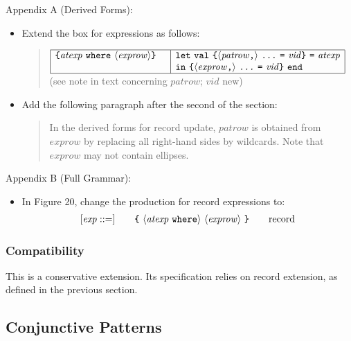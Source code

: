 \documentclass[twoside,titlepage]{article}
\begin{document}
\begin{appendix}
Appendix A (Derived Forms):
\begin{itemize}
\item Extend the box for expressions as follows: 
  \begin{quote}
  $\begin{array}{|l|l|}
  \hline
  \mbox{\tt\{}\mathit{atexp}~{\tt{where}}~\langle\mathit{exprow}\rangle\mbox{\tt\}}~~~
  & {\tt let}~{\tt val}~\mbox{\tt\{}\langle\mathit{patrow}\mbox{\tt,}\rangle~\mbox{\tt...}~\mbox{\tt=}~\mathit{vid}\mbox{\tt\}}~\mbox{\tt=}~\mathit{atexp} \\
  & {\tt in}~\mbox{\tt\{}\langle\mathit{exprow}\mbox{\tt,}\rangle~\mbox{\tt...}~\mbox{\tt=}~\mathit{vid}\mbox{\tt\}}~{\tt end} \\
  \hline
  \end{array}$ \\
  (see note in text concerning $\mathit{patrow}$; $\mathit{vid}$ new)
  \end{quote}

\item Add the following paragraph after the second of the section:
  \begin{quote}
  In the derived forms for record update, $\mathit{patrow}$ is obtained from $\mathit{exprow}$ by replacing all right-hand sides by wildcards. Note that $\mathit{exprow}$ may not contain ellipses.
  \end{quote}
\end{itemize}

Appendix B (Full Grammar):
\begin{itemize}
\item  In Figure 20, change the production for record expressions to: 
  $$
  \begin{array}{l@{\qquad}l@{\qquad}l}
   [\mathit{exp} ::=] & \mbox{\tt\{}~\langle\mathit{atexp}~{\tt where}\rangle~\langle\mathit{exprow}\rangle~\mbox{\tt\}} & \textrm{record}
  \end{array}
  $$
\end{itemize}

\subsubsection*{Compatibility}

This is a conservative extension. Its specification relies on record extension, as defined in the previous section.


\subsection{Conjunctive Patterns}
\label{ext-conjunctivepatterns}


\end{appendix}
\end{document}
